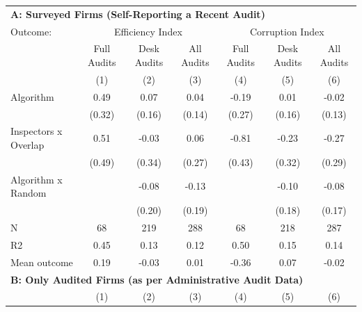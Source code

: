 \begin{tabular}{lccc|ccc} \toprule
\multicolumn{7}{l}{\textbf{A: Surveyed Firms (Self-Reporting a Recent Audit)}} \\ \multicolumn{1}{l}{Outcome:} & \multicolumn{3}{c}{Efficiency Index} & \multicolumn{3}{c}{Corruption Index} \\ \multicolumn{1}{l}{} & Full Audits & Desk Audits & All Audits & Full Audits & Desk Audits & All Audits \\ \multicolumn{1}{l}{} & (1) & (2) & (3) & (4) & (5) & (6) \\ \midrule
Algorithm   &        0.49         &        0.07         &        0.04         &       -0.19         &        0.01         &       -0.02         \\
            &      (0.32)         &      (0.16)         &      (0.14)         &      (0.27)         &      (0.16)         &      (0.13)         \\
\addlinespace
Inspectors x Overlap&        0.51         &       -0.03         &        0.06         &       -0.81\sym{*}  &       -0.23         &       -0.27         \\
            &      (0.49)         &      (0.34)         &      (0.27)         &      (0.43)         &      (0.32)         &      (0.29)         \\
\addlinespace
Algorithm x Random&                     &       -0.08         &       -0.13         &                     &       -0.10         &       -0.08         \\
            &                     &      (0.20)         &      (0.19)         &                     &      (0.18)         &      (0.17)         \\
\midrule
N           &          68         &         219         &         288         &          68         &         218         &         287         \\
R2          &        0.45         &        0.13         &        0.12         &        0.50         &        0.15         &        0.14         \\
Mean outcome&        0.19         &       -0.03         &        0.01         &       -0.36         &        0.07         &       -0.02         \\

\midrule \multicolumn{7}{l}{\textbf{B: Only Audited Firms (as per Administrative Audit Data)}} \\ \multicolumn{1}{l}{} & (1) & (2) & (3) & (4) & (5) & (6) \\ \midrule


\end{tabular}
